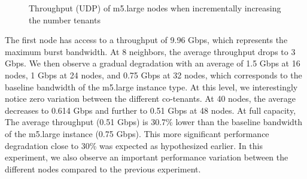 \begin{figure}[H]
\caption{Throughput (UDP) of m5.large nodes when incrementally increasing the number tenants}
\end{figure}
\noindent
The first node has access to a throughput of 9.96 Gbps, which represents the maximum burst bandwidth. 
At 8 neighbors, the average throughput drops to 3 Gbps. We then observe a gradual degradation 
with an average of 1.5 Gbps at 16 nodes, 1 Gbps at 24 nodes, and  0.75 Gbps at 32 nodes,  which corresponds 
to the baseline bandwidth of the m5.large instance type. 
At this level, we interestingly notice zero variation between the 
different co-tenants. At 40 nodes, the average decreases to 0.614 Gbps and further to 0.51 Gbps at 48 nodes.  
At full capacity, The average throughput (0.51 Gbps) is 30.7\% lower than the baseline bandwidth of the 
m5.large instance (0.75 Gbps). This more significant performance degradation close to 30\% was expected 
as hypothesized earlier. In this experiment, we also observe an important performance variation 
between the different nodes compared to the previous experiment.
